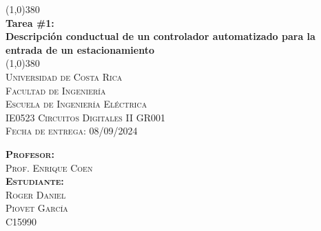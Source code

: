 \begin{titlepage}    
    \begin{center}
        \line(1,0){380}\\
        [5mm]
        \huge{\bfseries 
            Tarea \#1:\\ 
            Descripción conductual de un controlador 
            automatizado para la entrada de un estacionamiento}\\
        \line(1,0){380}\\
        [1.5cm]
        \textsc{\Large 
            Universidad de Costa Rica\\
            Facultad de Ingeniería\\
            Escuela de Ingeniería Eléctrica\\
            IE0523 Circuitos Digitales II GR001\\ \vspace{-0.25cm}
            Fecha de entrega: 08/09/2024}
        \vspace{1.0cm}
        \begin{flushleft}
            \textsc{\large
                \textbf{Profesor:}\\ 
                Prof. Enrique Coen\\[5mm]
                \textbf{Estudiante:}\\ 
                Roger Daniel\\
                Piovet García\\[2mm]
                C15990\\}
        \end{flushleft}
    \end{center}
\end{titlepage}
\restoregeometry
